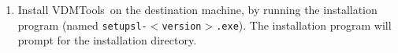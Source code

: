 \documentclass[\pformat,12pt]{article}
\newcommand{\ifSLPP}[2]{#1-$<$version$>$}
\newcommand{\Toolbox}{VDMTools}
\newcommand{\ifSLPP}[2]{#2-<version>}
\newcommand{\Toolbox}{VDMTools}
\begin{document}
\begin{enumerate}
\item Install \Toolbox\ on the destination machine, by running the
  installation program (named \texttt{setup\ifSLPP{sl}{pp}.exe}).  The
  installation program will prompt for the installation directory.
  



  
  
  
    
  

\end{enumerate}
\end{document}
